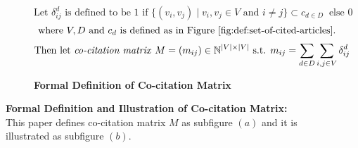 \begin{figure}[h]
    \begin{subfigure}[b]{1\textwidth}
        \[\text{Let } \delta^d_{ij} \text{ is defined to be } 1 \text{ if } \{(v_i, v_j) \mid v_i, v_j \in V \text{ and } i \neq j \} \subset c_{d \in D} \ \text{ else } 0\]
        \[\text{ where } V, D \text{ and } c_d \text{ is defined as in Figure \ref{fig:def:set-of-cited-articles}}. \]
        \[\text{Then let \textit{co-citation matrix} } M = (m_{ij}) \in \Bbb{N}^{|V| \times |V|} \text{ s.t. } m_{ij} = \sum_{d \in D}\sum_{i,j \in V}\delta^d_{ij}\]
        \caption{\textbf{Formal Definition of Co-citation Matrix}}
        \label{subfig:co-cites:def}
    \end{subfigure}
    \vfill
    \begin{subfigure}[b]{1\textwidth}
    \end{subfigure}
    \label{fig:def-illus-co-cites}      
    \caption{\textbf{Formal Definition and Illustration of Co-citation Matrix:} This paper defines co-citation matrix $M$ as subfigure $(a)$ and it is illustrated as subfigure $(b)$.} 
\end{figure}